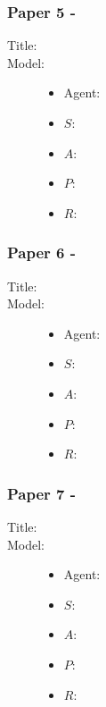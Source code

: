 \documentclass{beamer}
\begin{document}
\begin{frame}
    \frametitle{Paper 5 - }
    \begin{description}
        \item[Title:] \footfullcite{}
        \item[Model:]
        \begin{itemize}
            \item Agent: 
            \item $S$: 
            \item $A$: 
            \item $P$: 
            \item $R$: 
        \end{itemize}
        \item[] 
    \end{description}
\end{frame}

\begin{frame}
    \frametitle{Paper 6 - }
    \begin{description}
        \item[Title:] \footfullcite{}
        \item[Model:]
        \begin{itemize}
            \item Agent: 
            \item $S$: 
            \item $A$: 
            \item $P$: 
            \item $R$: 
        \end{itemize}
        \item[] 
    \end{description}
\end{frame}

\begin{frame}
    \frametitle{Paper 7 - }
    \begin{description}
        \item[Title:] \footfullcite{}
        \item[Model:]
        \begin{itemize}
            \item Agent: 
            \item $S$: 
            \item $A$: 
            \item $P$: 
            \item $R$: 
        \end{itemize}
        \item[] 
    \end{description}
\end{frame}
\end{document}

